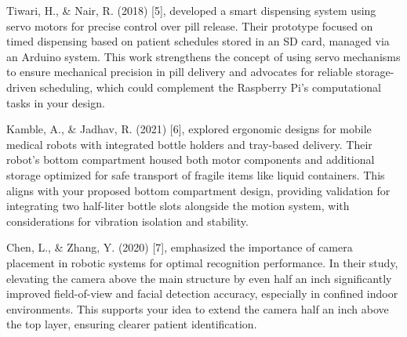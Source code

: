 Tiwari, H., \& Nair, R. (2018) [5], developed a smart dispensing system using servo motors for precise control over pill release. Their prototype focused on timed dispensing based on patient schedules stored in an SD card, managed via an Arduino system. This work strengthens the concept of using servo mechanisms to ensure mechanical precision in pill delivery and advocates for reliable storage-driven scheduling, which could complement the Raspberry Pi’s computational tasks in your design.

Kamble, A., \& Jadhav, R. (2021) [6], explored ergonomic designs for mobile medical robots with integrated bottle holders and tray-based delivery. Their robot’s bottom compartment housed both motor components and additional storage optimized for safe transport of fragile items like liquid containers. This aligns with your proposed bottom compartment design, providing validation for integrating two half-liter bottle slots alongside the motion system, with considerations for vibration isolation and stability.

Chen, L., \& Zhang, Y. (2020) [7], emphasized the importance of camera placement in robotic systems for optimal recognition performance. In their study, elevating the camera above the main structure by even half an inch significantly improved field-of-view and facial detection accuracy, especially in confined indoor environments. This supports your idea to extend the camera half an inch above the top layer, ensuring clearer patient identification.


